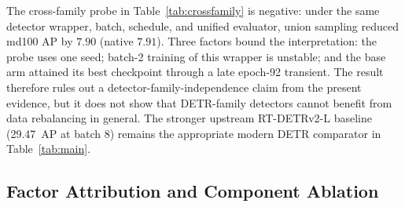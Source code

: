 \documentclass[journal]{IEEEtran}
\newcommand{\ap}{\ensuremath{\mathrm{AP}}}
\begin{document}
The cross-family probe in Table~\ref{tab:crossfamily} is negative: under the same detector wrapper, batch, schedule, and unified evaluator, union sampling reduced md100 \ap{} by $7.90$ (native $7.91$). Three factors bound the interpretation: the probe uses one seed; batch-2 training of this wrapper is unstable; and the base arm attained its best checkpoint through a late epoch-92 transient. The result therefore rules out a detector-family-independence claim from the present evidence, but it does not show that DETR-family detectors cannot benefit from data rebalancing in general. The stronger upstream RT-DETRv2-L baseline (29.47~\ap{} at batch 8) remains the appropriate modern DETR comparator in Table~\ref{tab:main}.

\subsection{Factor Attribution and Component Ablation}
\label{sec:attribution}
\end{document}

